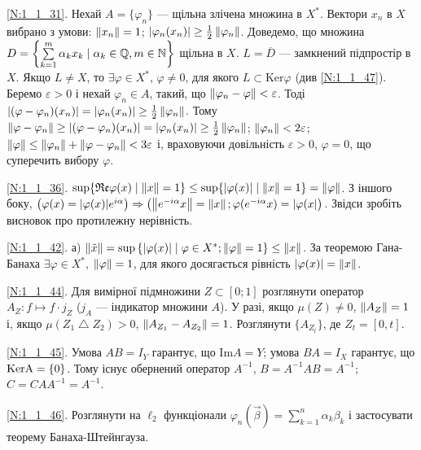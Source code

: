 \noindent\ref{N:1_1_31}. Нехай $A = \{\varphi_n\}$ --- щільна злічена множина в $X^*$.
Вектори $x_n$ в $X$ вибрано з умови: $\left\lVert x_n\right\rVert = 1$;
$|\varphi_n(x_n)| \geq \frac{1}{2}\left\lVert\varphi_n\right\rVert$.
Доведемо, що множина $D = \left\lbrace \sum\limits_{k=1}^{m} \alpha_k x_k \mid 
\alpha_k \in \mathbb{Q}, m \in \mathbb{N}\right\rbrace$ щільна в $X$.
$L = \overline{D}$ --- замкнений підпростір в $X$. Якщо $L \neq X$, то $\exists \varphi \in X^*$,
$\varphi \neq 0$, для якого $L \subset \mathrm{Ker}\varphi$ (див \ref{N:1_1_47}).
Беремо $\varepsilon > 0$ і нехай $\varphi_n \in A$, такий, що $\left\lVert\varphi_n - \varphi\right\rVert < \varepsilon$.
Тоді $|(\varphi-\varphi_n)(x_n)| = |\varphi_n(x_n)| \geq \frac{1}{2} \left\lVert\varphi_n\right\rVert$.
Тому $\left\lVert\varphi-\varphi_n\right\rVert \geq |(\varphi-\varphi_n)(x_n)| = |\varphi_n(x_n)| \geq
\frac{1}{2}\left\lVert\varphi_n\right\rVert$;\; $\left\lVert\varphi_n\right\rVert <2\varepsilon$;
$\left\lVert\varphi\right\rVert \leq \left\lVert\varphi_n\right\rVert + \left\lVert\varphi - \varphi_n\right\rVert < 3 \varepsilon$ і,
враховуючи довільність $\varepsilon > 0$, $\varphi = 0$, що суперечить вибору $\varphi$.

\noindent\ref{N:1_1_36}. $\sup\{\mathfrak{Re}\varphi(x) \mid \left\lVert x\right\rVert = 1\} \leq
\sup\{ |\varphi(x)| \mid \left\lVert x\right\rVert=1 \} = \left\lVert\varphi\right\rVert$.
З іншого боку, $\left(\varphi(x) = |\varphi(x)| e^{i \alpha}\right) \Rightarrow
\left( \left\lVert e^{-i \alpha}x\right\rVert = \left\lVert x\right\rVert; \varphi(e^{-i \alpha} x) = |\varphi(x| \right)$.
Звідси зробіть висновок про протилежну нерівність.

\noindent\ref{N:1_1_42}. а) $\left\lVert\tilde{x}\right\rVert = \sup\left\{|\varphi(x)| \mid
\varphi\in X^*; \left\lVert\varphi\right\rVert=1\right\} \leq \left\lVert x\right\rVert$. За теоремою Гана-Банаха 
$\exists\varphi\in X^*$, $\left\lVert\varphi\right\rVert = 1$, для якого досягається рівність
$|\varphi(x)| = \left\lVert x\right\rVert$.

\noindent\ref{N:1_1_44}. Для вимірної підмножини $Z \subset [0; 1]$ розглянути оператор
$A_Z: f \mapsto f \cdot j_Z$ ($j_A$ --- індикатор множини $A$). У разі, якщо $\mu(Z) \neq 0$, 
$\left\lVert A_Z\right\rVert = 1$ і, якщо $\mu (Z_1 \bigtriangleup Z_2) > 0$, $\left\lVert A_{Z_1} - A_{Z_2}\right\rVert = 1$.
Розглянути $\{A_{Z_t}\}$, де $Z_t = [0, t]$.

\noindent\ref{N:1_1_45}. Умова $AB = I_Y$ гарантує, що $\mathrm{Im} A = Y$; умова $BA = I_X$
гарантує, що $\rm KerA = \{0\}$. Тому існує обернений оператор $A^{-1}$, $B = A^{-1}AB = A^{-1}$; $C = CAA^{-1} = A^{-1}$.

\noindent\ref{N:1_1_46}. Розглянути на $\ell_2$ функціонали $\varphi_n (\vec{\beta}) = \sum\limits_{k = 1}^{n} \alpha_k \beta_k$
і застосувати теорему Банаха-Штейнгауза.

